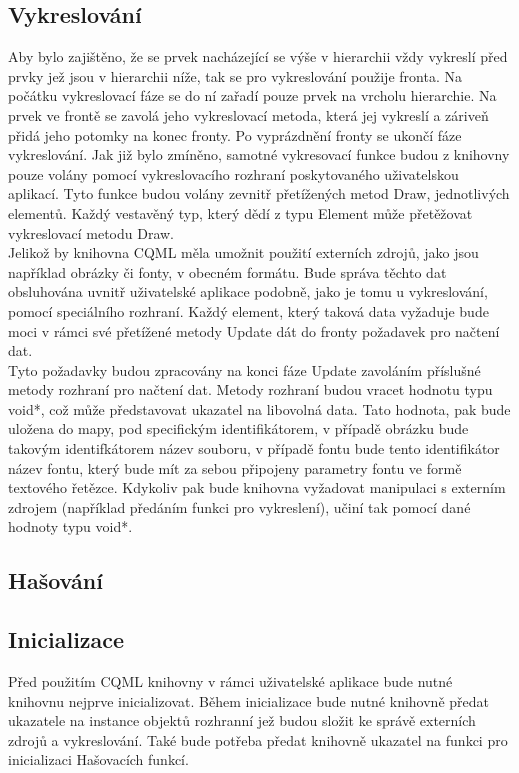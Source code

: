 \documentclass[report,11pt]{elsarticle}
\begin{document}
\subsection {Vykreslování}
Aby bylo zajištěno, že se prvek nacházející se výše v hierarchii vždy vykreslí před prvky jež jsou v hierarchii níže, tak se pro vykreslování použije fronta. Na počátku vykreslovací fáze se do ní zařadí pouze prvek na vrcholu hierarchie. Na prvek ve frontě se zavolá jeho vykreslovací metoda, která jej vykreslí a záriveň přidá jeho potomky na konec fronty. Po vyprázdnění fronty se ukončí fáze vykreslování.
Jak již bylo zmíněno, samotné vykresovací funkce budou z knihovny pouze volány pomocí vykreslovacího rozhraní poskytovaného uživatelskou aplikací. Tyto funkce budou volány zevnitř přetížených metod Draw, jednotlivých elementů. Každý vestavěný typ, který dědí z typu Element může přetěžovat vykreslovací metodu Draw.\\


Jelikož by knihovna CQML měla umožnit použití externích zdrojů, jako jsou například obrázky či fonty, v obecném formátu. Bude správa těchto dat obsluhována uvnitř uživatelské aplikace podobně, jako je tomu u vykreslování, pomocí speciálního rozhraní. Každý element, který taková data vyžaduje bude moci v rámci své přetížené metody Update dát do fronty požadavek pro načtení dat.\\
Tyto požadavky budou zpracovány na konci fáze Update zavoláním příslušné metody rozhraní pro načtení dat. Metody rozhraní budou vracet hodnotu typu void*, což může představovat ukazatel na libovolná data. Tato hodnota, pak bude uložena do mapy, pod specifickým identifikátorem, v případě obrázku bude takovým identifkátorem název souboru, v případě fontu bude tento identifikátor název fontu, který bude mít za sebou připojeny parametry fontu ve formě textového řetězce. Kdykoliv pak bude knihovna vyžadovat manipulaci s externím zdrojem (například předáním funkci pro vykreslení), učiní tak pomocí dané hodnoty typu void*. \\

\subsection {Hašování}

\subsection {Inicializace}
Před použitím CQML knihovny v rámci uživatelské aplikace bude nutné knihovnu nejprve inicializovat. Během inicializace bude nutné knihovně předat ukazatele na instance objektů rozhranní jež budou složit ke správě externích zdrojů a vykreslování. Také bude potřeba předat knihovně ukazatel na funkci pro inicializaci Hašovacích funkcí.\\
\end{document}
